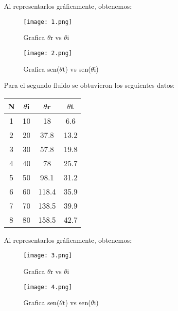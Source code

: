 \documentclass[10pt,journal]{IEEEtran}
\begin{document}
Al representarlos gráficamente, obtenemos:

\begin{figure}[!ht]
\begin {center}
\texttt{[image: 1.png]}
\caption{Grafica $\theta$r vs $\theta$i}
\end {center}
\end{figure}

\begin{figure}[!ht]
\begin {center}
\texttt{[image: 2.png]}
\caption{Grafica sen($\theta$t) vs sen($\theta$i)}
\end {center}
\end{figure}


Para el segundo fluido se obtuvieron los seguientes datos:

\begin{center}
\begin{tabular}{|c|c|c|c|}
\hline
N & $\theta$i & $\theta$r & $\theta$t \\
\hline
1 & 10 & 18 & 6.6\\
\hline
2 & 20 & 37.8 & 13.2\\
\hline
3 & 30 & 57.8 & 19.8\\
\hline
4 & 40 & 78 & 25.7 \\
\hline
5 & 50 & 98.1 & 31.2 \\
\hline
6 & 60 & 118.4 & 35.9 \\
\hline
7 & 70 & 138.5 & 39.9\\
\hline
8 & 80 & 158.5 & 42.7 \\
\hline
\end{tabular}
\end{center}


Al representarlos gráficamente, obtenemos:

\begin{figure}[!ht]
\begin {center}
\texttt{[image: 3.png]}
\caption{Grafica $\theta$r vs $\theta$i}
\end {center}
\end{figure}

\begin{figure}[!ht]
\begin {center}
\texttt{[image: 4.png]}
\caption{Grafica sen($\theta$t) vs sen($\theta$i)}
\end {center}
\end{figure}
\end{document}
